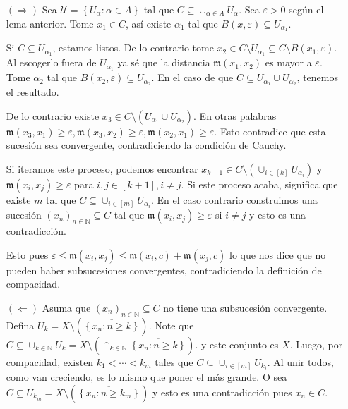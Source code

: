 \documentclass[12pt]{article}
\theoremstyle{plain}
\theoremstyle{definition}
\theoremstyle{remark}
\numberwithin{equation}{section}
\newcommand{\bN}{\mathbb{N}}        %
\newcommand{\mm}{\mathfrak{m}}      %
\newcommand{\cU}{\mathcal{U}}       %
\renewcommand{\geq}{\geqslant}      %
\renewcommand{\leq}{\leqslant}      %
\renewcommand{\:}{\colon}           %
\newcommand{\conj}[1]{\left\lbrace#1\right\rbrace}
\newcommand{\bonj}[1]{\left\lbrack#1\right\rbrack}
\begin{document}
\begin{multicols}{2}
\begin{ptcbp}
\begin{enumerate}
  \item[$(\Rightarrow)$] Sea $\cU=\conj{U_\alpha\colon \alpha\in A}$ tal que $C\subseteq\cup_{\alpha\in A}U_{\alpha}$. Sea $\varepsilon>0$ según el lema anterior. Tome $x_1\in C$, así existe $\alpha_1$ tal que $B(x,\varepsilon)\subseteq U_{\alpha_1}$. \par
      Si $C\subseteq U_{\alpha_1}$, estamos listos. De lo contrario tome $x_2\in C\setminus U_{\alpha_1}\subseteq C\setminus B(x_1,\varepsilon)$. Al escogerlo fuera de $U_{\alpha_1}$ ya sé que la distancia $\mm(x_1,x_2)$ es mayor a $\varepsilon$. Tome $\alpha_2$ tal que $B(x_2,\varepsilon)\subseteq U_{\alpha_2}$. En el caso de que $C\subseteq U_{\alpha_1}\cup U_{\alpha_2}$, tenemos el resultado.\par
      De lo contrario existe $x_3\in C\setminus(U_{\alpha_1}\cup U_{\alpha_2})$. En otras palabras $\mm(x_3,x_1)\geq\varepsilon, \mm(x_3,x_2)\geq\varepsilon, \mm(x_2,x_1)\geq\varepsilon$. Esto contradice que esta sucesión sea convergente, contradiciendo la condición de Cauchy.\par
      Si iteramos este proceso, podemos encontrar $x_{k+1}\in C\setminus(\cup_{i\in\bonj{k}}U_{\alpha_i})$ y $\mm(x_i,x_j)\geq\varepsilon$ para $i,j\in\bonj{k+1}, i\neq j$. Si este proceso acaba, significa que existe $m$ tal que $C\subseteq\cup_{i\in\bonj{m}}U_{\alpha_i}$. En el caso contrario construimos una sucesión $(x_n)_{n\in\bN}\subseteq C$ tal que $\mm(x_i,x_j)\geq \varepsilon$ si $i\neq j$ y esto es una contradicción.\par
      Esto pues $\varepsilon\leq\mm(x_i,x_j)\leq \mm(x_i,c)+\mm(x_j,c)$ lo que nos dice que no pueden haber subsucesiones convergentes, contradiciendo la definición de compacidad.
  \item[$(\Leftarrow)$] Asuma que $(x_n)_{n\in\bN}\subseteq C$ no tiene una subsucesión convergente. Defina $U_k=X\setminus (\overline{\conj{x_n\colon n\geq k}})$. Note que $C\subseteq\cup_{k\in\bN}U_k=X\setminus (\cap_{k\in\bN}\overline{\conj{x_n\colon n\geq k}})$.
      y este conjunto es $X$. Luego, por compacidad, existen $k_1<\cdots<k_m$ tales que $C\subseteq\cup_{i\in\bonj{m}}U_{k_i}$. Al unir todos, como van creciendo, es lo mismo que poner el más grande. O sea $C\subseteq U_{k_m}=X\setminus (\overline{\conj{x_n\colon n\geq k_m}})$ y esto es una contradicción pues $x_n\in C$.
\end{enumerate}
\end{ptcbp}


\end{multicols}
\end{document}
